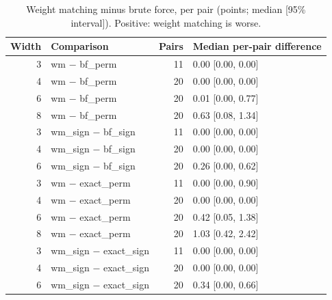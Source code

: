 \documentclass[11pt]{article}
\newcommand{\md}[1]{\textsf{#1}}
\begin{document}
\begin{table}[H]
\centering
\small
\caption{Weight matching minus brute force, per pair (points; median [95\% interval]). Positive: weight matching is worse.}
\label{tab:q3diff}
\begin{tabular}{@{}rlrl@{}}
\toprule
Width & Comparison & Pairs & Median per-pair difference \\
\midrule
3 & \md{wm} $-$ \md{bf\_perm} & 11 & 0.00 [0.00, 0.00] \\
4 & \md{wm} $-$ \md{bf\_perm} & 20 & 0.00 [0.00, 0.00] \\
6 & \md{wm} $-$ \md{bf\_perm} & 20 & 0.01 [0.00, 0.77] \\
8 & \md{wm} $-$ \md{bf\_perm} & 20 & 0.63 [0.08, 1.34] \\
3 & \md{wm\_sign} $-$ \md{bf\_sign} & 11 & 0.00 [0.00, 0.00] \\
4 & \md{wm\_sign} $-$ \md{bf\_sign} & 20 & 0.00 [0.00, 0.00] \\
6 & \md{wm\_sign} $-$ \md{bf\_sign} & 20 & 0.26 [0.00, 0.62] \\
3 & \md{wm} $-$ \md{exact\_perm} & 11 & 0.00 [0.00, 0.90] \\
4 & \md{wm} $-$ \md{exact\_perm} & 20 & 0.00 [0.00, 0.00] \\
6 & \md{wm} $-$ \md{exact\_perm} & 20 & 0.42 [0.05, 1.38] \\
8 & \md{wm} $-$ \md{exact\_perm} & 20 & 1.03 [0.42, 2.42] \\
3 & \md{wm\_sign} $-$ \md{exact\_sign} & 11 & 0.00 [0.00, 0.00] \\
4 & \md{wm\_sign} $-$ \md{exact\_sign} & 20 & 0.00 [0.00, 0.00] \\
6 & \md{wm\_sign} $-$ \md{exact\_sign} & 20 & 0.34 [0.00, 0.66] \\
\bottomrule
\end{tabular}
\end{table}
\end{document}
